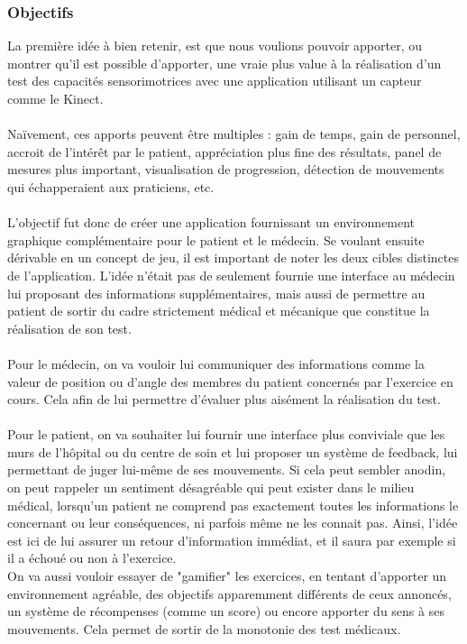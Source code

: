 \documentclass[french,12pt]{report}
\begin{document}
\subsubsection{Objectifs}
La première idée à bien retenir, est que nous voulions pouvoir apporter, ou montrer qu'il est possible d'apporter, une vraie plus 
value à la réalisation d'un test des capacités sensorimotrices avec une application utilisant un capteur comme le Kinect.
\paragraph{}
Naïvement, ces apports peuvent être multiples : gain de temps, gain de personnel, accroit de l'intérêt par le patient, appréciation
plus fine des résultats, panel de mesures plus important, visualisation de progression, détection de mouvements qui
échapperaient aux praticiens, etc.

\paragraph{}
L'objectif fut donc de créer une application fournissant un environnement graphique complémentaire pour le patient et le médecin.
Se voulant ensuite dérivable en un concept de jeu, il est important de noter les deux cibles distinctes de l'application. L'idée 
n'était pas de seulement fournie une interface au médecin lui proposant des informations supplémentaires, mais aussi de
permettre au patient de sortir du cadre strictement médical et mécanique que constitue la réalisation de son test.

\paragraph{}
Pour le médecin, on va vouloir lui communiquer des informations comme la valeur de position ou d'angle des membres du
patient concernés par l'exercice en cours. Cela afin de lui permettre d'évaluer plus aisément la réalisation du test. 

\paragraph{}
Pour le patient, on va souhaiter lui fournir une interface plus conviviale que les murs de l'hôpital ou du centre de soin et lui
proposer un système de feedback, lui permettant de juger lui-même de ses mouvements. Si cela peut sembler anodin, on
peut rappeler un sentiment désagréable qui peut exister dans le milieu médical, lorsqu'un patient ne comprend pas exactement
toutes les informations le concernant ou leur conséquences, ni parfois même ne les connait pas. Ainsi, l'idée est ici de lui
assurer un retour d'information immédiat, et il saura par exemple si il a échoué ou non à l'exercice.\\
On va aussi vouloir essayer de "gamifier" les exercices, en tentant d'apporter un environnement agréable, des objectifs
apparemment différents de ceux annoncés, un système de récompenses (comme un score) ou encore apporter du sens
à ses mouvements. Cela permet de sortir de la monotonie des test médicaux.
\end{document}
